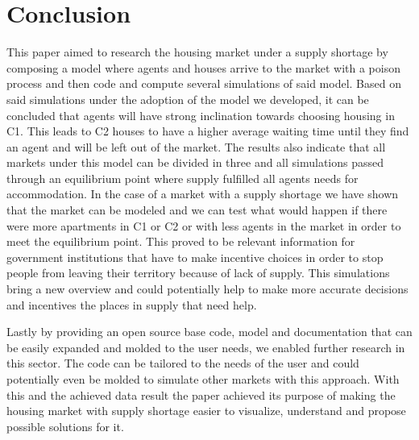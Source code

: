\section{Conclusion}

This paper aimed to research the housing market under a supply shortage by composing a model where agents and houses arrive to the market with a poison process and then code and compute several simulations of said model. Based on said simulations under the adoption of the model we developed, it can be concluded that agents will have strong inclination towards choosing housing in C1. This leads to C2 houses to have a higher average waiting time until they find an agent and will be left out of the market. The results also indicate that all markets under this model can be divided in three and all simulations passed through an equilibrium point where supply fulfilled all agents needs for accommodation. In the case of a market with a supply shortage we have shown that the market can be modeled and we can test what would happen if there were more apartments in C1 or C2 or with less agents in the market in order to meet the equilibrium point. This proved to be relevant information for government institutions that have to make incentive choices in order to stop people from leaving their territory because of lack of supply. This simulations bring a new overview and could potentially help to make more accurate decisions and incentives the places in supply that need help.


Lastly by providing an open source base code, model and documentation that can be easily expanded and molded to the user needs, we enabled further research in this sector. The code can be tailored to the needs of the user and could potentially even be molded to simulate other markets with this approach. With this and the achieved data result the paper achieved its purpose of making the housing market with supply shortage easier to visualize, understand and propose possible solutions for it.